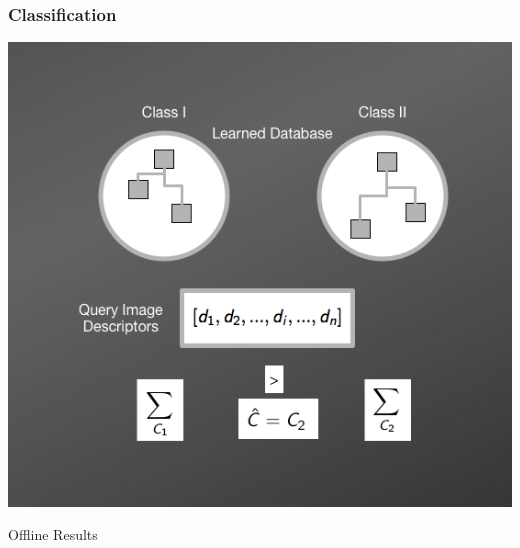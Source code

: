 \documentclass[aspectratio=169]{beamer}
\begin{document}
    \begin{frame}
        \frametitle{Classification}
        \begin{center}
            \item \includegraphics[scale=0.38]{images/NBNNMethod5.png}     
        \end{center}
    \end{frame}    
    
    
    \begin{frame}
        \begin{center}
            \LARGE Offline Results   
        \end{center}
    \end{frame}
    
\end{document}
